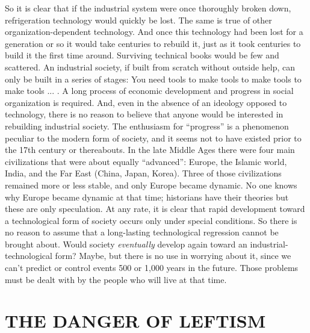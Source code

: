  So it is clear that if the industrial system were once thoroughly broken down, refrigeration technology would quickly be lost. The same is true of other organization-dependent technology. And once this technology had been lost for a generation or so it would take centuries to rebuild it, just as it took centuries to build it the first time around. Surviving technical books would be few and scattered. An industrial society, if built from scratch without outside help, can only be built in a series of stages: You need tools to make tools to make tools to make tools ... . A long process of economic development and progress in social organization is required. And, even in the absence of an ideology opposed to technology, there is no reason to believe that anyone would be interested in rebuilding industrial society. The enthusiasm for “progress” is a phenomenon peculiar to the modern form of society, and it seems not to have existed prior to the 17th century or thereabouts.
 In the late Middle Ages there were four main civilizations that were about equally “advanced”: Europe, the Islamic world, India, and the Far East (China, Japan, Korea). Three of those civilizations remained more or less stable, and only Europe became dynamic. No one knows why Europe became dynamic at that time; historians have their theories but these are only speculation. At any rate, it is clear that rapid development toward a technological form of society occurs only under special conditions. So there is no reason to assume that a long-lasting technological regression cannot be brought about.
 Would society {\em eventually} develop again toward an industrial-technological form? Maybe, but there is no use in worrying about it, since we can’t predict or control events 500 or 1,000 years in the future. Those problems must be dealt with by the people who will live at that time.

\chapter{THE DANGER OF LEFTISM}

